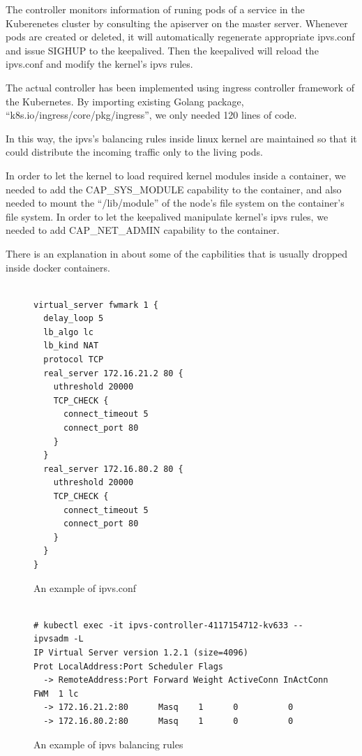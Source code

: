 The controller monitors information of runing pods of a service in the Kuberenetes cluster by consulting the apiserver on the master server.
Whenever pods are created or deleted, it will automatically regenerate appropriate ipvs.conf and issue SIGHUP to the keepalived.
Then the keepalived will reload the ipvs.conf and modify the kernel's ipvs rules.  

The actual controller\cite{ktaka_ccmp_2017_826894} has been implemented using ingress controller\cite{K8sIngress2017} framework of the Kubernetes.
By importing existing Golang package, \enquote{k8s.io/ingress/core/pkg/ingress},
we only needed 120 lines of code.  

In this way, the ipvs's balancing rules inside linux kernel are maintained so that it could distribute the incoming traffic only to the living pods.

In order to let the kernel to load required kernel modules inside a container, 
we needed to add the CAP\_SYS\_MODULE capability to the container, 
and also needed to mount the \enquote{/lib/module} of the node's file system on the container's file system.   
In order to let the keepalived manipulate kernel's ipvs rules, 
we needed to add CAP\_NET\_ADMIN capability to the container.

There is an explanation in \cite{mp2016enhancing} about some of the capbilities 
that is usually dropped inside docker containers.

\begin{figure}
\begin{minipage}{0.7\columnwidth}
\begin{verbatim}

virtual_server fwmark 1 {
  delay_loop 5
  lb_algo lc
  lb_kind NAT
  protocol TCP
  real_server 172.16.21.2 80 {
    uthreshold 20000
    TCP_CHECK {
      connect_timeout 5
      connect_port 80
    }
  }
  real_server 172.16.80.2 80 {
    uthreshold 20000
    TCP_CHECK {
      connect_timeout 5
      connect_port 80
    }
  }
}

\end{verbatim}
\end{minipage}
\caption{An example of ipvs.conf}
\label{fig:ipvs.conf}
\end{figure}

\begin{figure}
\begin{minipage}{\columnwidth}
\small
\begin{verbatim}

# kubectl exec -it ipvs-controller-4117154712-kv633 -- ipvsadm -L
IP Virtual Server version 1.2.1 (size=4096)
Prot LocalAddress:Port Scheduler Flags
  -> RemoteAddress:Port Forward Weight ActiveConn InActConn
FWM  1 lc
  -> 172.16.21.2:80      Masq    1      0          0         
  -> 172.16.80.2:80      Masq    1      0          0

\end{verbatim}
\end{minipage}
\caption{An example of ipvs balancing rules}
\label{fig:ipvs rule}
\end{figure}

